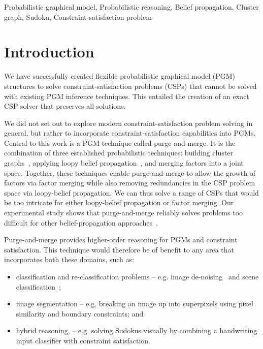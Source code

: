 \documentclass{ieeeaccess}
\begin{document}
\begin{keywords} Probabilistic graphical model, Probabilistic reasoning, Belief propagation, Cluster graph, Sudoku, Constraint-satisfaction problem \end{keywords}

\titlepgskip=-15pt

\maketitle

\section{Introduction}
We have successfully created flexible probabilistic graphical model (PGM) structures to solve constraint-satisfaction problems (CSPs) that cannot be solved with existing PGM inference techniques. This entailed the creation of an exact CSP solver that preserves all solutions. 

We did not set out to explore modern constraint-satisfaction problem solving in general, but rather to incorporate constraint-satisfaction capabilities into PGMs. Central to this work is a PGM technique called purge-and-merge. It is the combination of three established probabilistic techniques: building cluster graphs~\cite{streicher}, applying loopy belief propagation~\cite{dechter2010on}, and merging factors into a joint space. Together, these techniques enable purge-and-merge to allow the growth of factors via factor merging while also removing redundancies in the CSP problem space via loopy-belief propagation. We can thus solve a range of CSPs that would be too intricate for either loopy-belief propagation or factor merging. Our experimental study shows that purge-and-merge reliably solves problems too difficult for other belief-propagation approaches~\cite{BaukeH, GoldbergerJ, KhanS, streicher}.

Purge-and-merge provides higher-order reasoning for PGMs and constraint satisfaction. This technique would therefore be of benefit to any area that incorporates both these domains, such as:
\begin{itemize}
	\item classification and re-classification problems -- e.g. image de-noising~\cite{koller} and scene classification~\cite{cvexample1};
	
	\item image segmentation -- e.g. breaking an image up into superpixels using pixel similarity and boundary constraints; and
	
	\item hybrid reasoning, -- e.g. solving Sudokus visually by combining a handwriting input classifier with constraint satisfaction.
\end{itemize}
\end{document}

